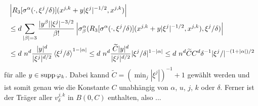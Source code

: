 \begin{align*}
&\Abs{R_3[\sigma^\alpha(\cdot,\xi^j/\delta)](x^{j,k}+y|\xi^j|^{-1/2},x^{j,k})} \\
&\le d\sum_{\abs\beta=3}\frac{|y^\beta||\xi^j|^{-3/2}}{\beta!}\Abs{\sigma^\alpha_\beta(R_3[\sigma^\alpha(\cdot,\xi^j/\delta)](x^{j,k}+y|\xi^j|^{-1/2},x^{j,k}),\xi^j/\delta) }\\
&\le d\ n^d\frac{\abs y ^d}{\abs{\xi^j}^{d/2}}\braket{\xi^j/\delta}^{1-\abs\alpha} \le d\ n^d\frac{\widetilde C\abs y ^d}{\abs{\xi^j}^{d/2}}|\xi^j/\delta|^{1-\abs\alpha} \le d\ n^d\widetilde C C ^d\delta^{-1}|\xi^j/|^{-(1+\abs\alpha)/2}
\end{align*}
für alle $y\in\operatorname{supp}\varphi_k$. Dabei kannd $\widetilde C = (\min_j|\xi^j|)^{-1} + 1$ gewählt werden und ist somit genau wie die Konstante $C$ unabhängig von $\alpha$, $u$, $j$, $k$ oder $\delta$. Ferner ist der Träger aller $v_\delta^{j,k}$ in $B(0,C)$ enthalten, also ...

